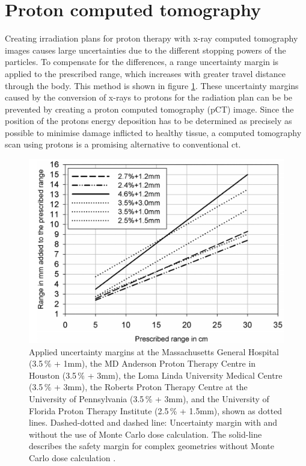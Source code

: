 \section{Proton computed tomography}
Creating irradiation plans for proton therapy with x-ray computed tomography images causes large uncertainties due to the different stopping powers of the particles.
To compensate for the differences, a range uncertainty margin is applied to the prescribed range, which increases with greater travel distance through the body. This
method is shown in figure \ref{fig:paganetti}. These uncertainty margins caused by the conversion of x-rays to protons for the radiation plan can be be prevented by creating a proton computed tomography (pCT) image.
Since the position of the protons energy deposition has to be determined as precisely as possible to minimise damage inflicted to healthy tissue, a computed tomography scan using protons
is a promising alternative to conventional ct.

\begin{figure}
  \centering
  \includegraphics[height=0.5\textwidth]{images/prescription.png}
  \caption{Applied uncertainty margins at the Massachusetts General Hospital (3.5\,\% +
1mm), the MD Anderson Proton Therapy Centre in Houston (3.5\,\% + 3mm), the Loma Linda
University Medical Centre (3.5\,\% + 3mm), the Roberts Proton Therapy Centre at the
University of Pennsylvania (3.5\,\% + 3mm), and the University of Florida Proton Therapy
Institute (2.5\,\% + 1.5mm), shown as dotted lines. Dashed-dotted and dashed line: Uncertainty margin with and without the use of Monte Carlo dose calculation.
The solid-line describes the safety margin for complex geometries without Monte Carlo dose calculation \cite{paganetti}.}
  \label{fig:paganetti}
\end{figure}

